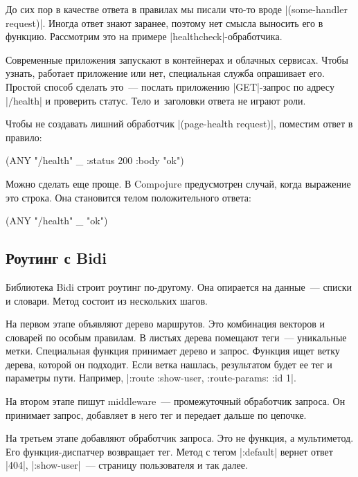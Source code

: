 До сих пор в качестве ответа в правилах мы писали что-то вроде
\spverb|(some-handler request)|. Иногда ответ знают заранее, поэтому нет смысла
выносить его в функцию. Рассмотрим это на примере
\spverb|healthcheck|-обработчика.

Современные приложения запускают в контейнерах и облачных сервисах. Чтобы
узнать, работает приложение или нет, специальная служба опрашивает его. Простой
способ сделать это~--- послать приложению \spverb|GET|-запрос по адресу
\spverb|/health| и проверить статус. Тело и~заголовки ответа не играют роли.

Чтобы не создавать лишний обработчик \spverb|(page-health request)|, поместим
ответ в правило:

\begin{english}
  \begin{clojure}
(ANY "/health" _ {:status 200 :body "ok"})
  \end{clojure}
\end{english}

Можно сделать еще проще. В Compojure предусмотрен случай, когда выражение это
строка. Она становится телом положительного ответа:

\begin{english}
  \begin{clojure}
(ANY "/health" _ "ok")
  \end{clojure}
\end{english}

\subsection{Роутинг с Bidi}

Библиотека Bidi строит роутинг
по-другому. Она опирается на данные~--- списки и словари. Метод состоит из
нескольких шагов.

На первом этапе объявляют дерево маршрутов. Это комбинация векторов и словарей
по особым правилам. В листьях дерева помещают теги~--- уникальные
метки. Специальная функция принимает дерево и запрос. Функция ищет ветку дерева,
которой он подходит. Если ветка нашлась, результатом будет ее тег и параметры
пути. Например, \spverb|{:route :show-user, :route-params: {:id 1}}|.

На втором этапе пишут middleware~--- промежуточный обработчик запроса. Он
принимает запрос, добавляет в него тег и передает дальше по цепочке.

На третьем этапе добавляют обработчик запроса. Это не функция, а мультиметод.
Его функция-диспатчер возвращает тег. Метод с тегом \spverb|:default| вернет
ответ \spverb|404|, \spverb|:show-user|~--- страницу пользователя и так далее.

